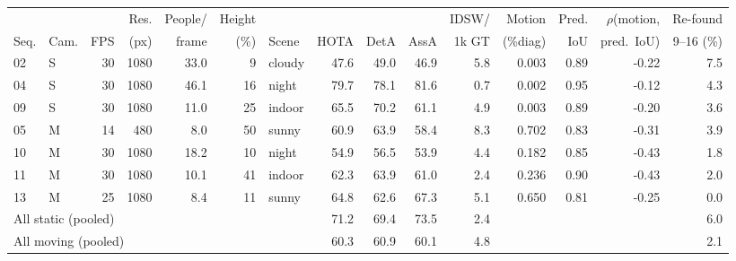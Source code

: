 \begin{tabular}{llrrrrlrrrrrrrr}
\toprule
 & & & Res. & People/ & Height & & & & & IDSW/ & Motion & Pred. & $\rho$(motion, & Re-found \\
Seq. & Cam. & FPS & (px) & frame & (\%) & Scene & HOTA & DetA & AssA & 1k GT & (\%diag) & IoU & pred.\ IoU) & 9--16 (\%) \\
\midrule
02 & S & 30 & 1080 & 33.0 & 9 & cloudy & 47.6 & 49.0 & 46.9 & 5.8 & 0.003 & 0.89 & -0.22 & 7.5 \\
04 & S & 30 & 1080 & 46.1 & 16 & night & 79.7 & 78.1 & 81.6 & 0.7 & 0.002 & 0.95 & -0.12 & 4.3 \\
09 & S & 30 & 1080 & 11.0 & 25 & indoor & 65.5 & 70.2 & 61.1 & 4.9 & 0.003 & 0.89 & -0.20 & 3.6 \\
\midrule
05 & M & 14 & 480 & 8.0 & 50 & sunny & 60.9 & 63.9 & 58.4 & 8.3 & 0.702 & 0.83 & -0.31 & 3.9 \\
10 & M & 30 & 1080 & 18.2 & 10 & night & 54.9 & 56.5 & 53.9 & 4.4 & 0.182 & 0.85 & -0.43 & 1.8 \\
11 & M & 30 & 1080 & 10.1 & 41 & indoor & 62.3 & 63.9 & 61.0 & 2.4 & 0.236 & 0.90 & -0.43 & 2.0 \\
13 & M & 25 & 1080 & 8.4 & 11 & sunny & 64.8 & 62.6 & 67.3 & 5.1 & 0.650 & 0.81 & -0.25 & 0.0 \\
\midrule
\multicolumn{7}{l}{All static (pooled)} & 71.2 & 69.4 & 73.5 & 2.4 & & & & 6.0 \\
\multicolumn{7}{l}{All moving (pooled)} & 60.3 & 60.9 & 60.1 & 4.8 & & & & 2.1 \\
\bottomrule
\end{tabular}
